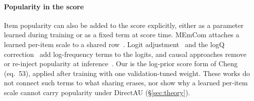 \paragraph{Popularity in the score}
Item popularity can also be added to the score explicitly, either as a parameter learned during training or as a fixed term at score time. MEmCom attaches a learned per-item scale to a shared row~\cite{pansare2022memcom}. Logit adjustment~\cite{menon2021logit} and the logQ correction~\cite{yi2019logq} add log-frequency terms to the logits, and causal approaches remove or re-inject popularity at inference~\cite{zhang2021pda,wei2021macr}. Our \crs{} is the log-prior score form of Cheng~\cite{cheng2026rankone} (eq.~53), applied after training with one validation-tuned weight. These works do not connect such terms to what sharing erases, nor show why a learned per-item scale cannot carry popularity under DirectAU (\S\ref{sec:theory}).
